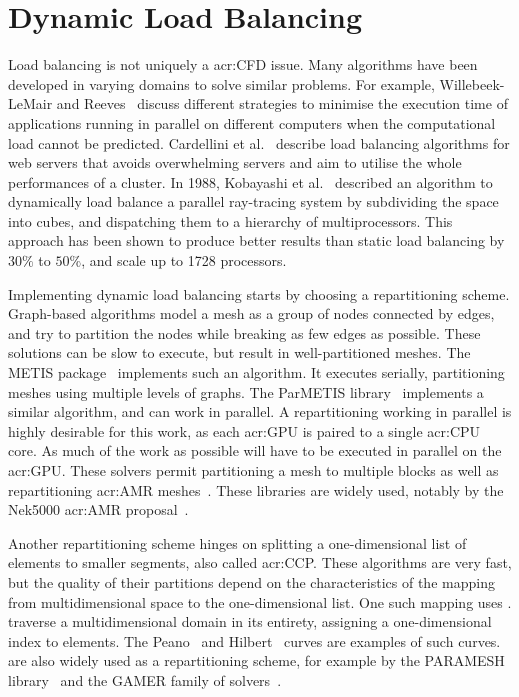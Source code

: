 \section{Dynamic Load Balancing}\label{section:literature_review:load_balancing}

Load balancing is not uniquely a \acrshort{acr:CFD} issue. Many algorithms have been developed in
varying domains to solve similar problems. For example, Willebeek-LeMair and
Reeves~\cite{Willebeek1993} discuss different strategies to minimise the execution time of
applications running in parallel on different computers when the computational load cannot be
predicted. Cardellini et al.~\cite{Cardellini1999} describe load balancing algorithms for web
servers that avoids overwhelming servers and aim to utilise the whole performances of a cluster. In
1988, Kobayashi et al.~\cite{Kobayashi1988} described an algorithm to dynamically load balance a
parallel ray-tracing system by subdividing the space into cubes, and dispatching them to a hierarchy
of multiprocessors. This approach has been shown to produce better results than static load
balancing by \(30 \% \) to \(50 \% \), and scale up to 1728 processors.

Implementing dynamic load balancing starts by choosing a repartitioning scheme. Graph-based
algorithms model a mesh as a group of nodes connected by edges, and try to partition the nodes while
breaking as few edges as possible. These solutions can be slow to execute, but result in
well-partitioned meshes. The METIS package~\cite{Karypis1997} implements such an algorithm. It
executes serially, partitioning meshes using multiple levels of graphs. The ParMETIS
library~\cite{Karypis1997P} implements a similar algorithm, and can work in parallel. A
repartitioning working in parallel is highly desirable for this work, as each \acrshort{acr:GPU} is
paired to a single \acrshort{acr:CPU} core. As much of the work as possible will have to be executed
in parallel on the \acrshort{acr:GPU}. These solvers permit partitioning a mesh to multiple blocks
as well as repartitioning \acrshort{acr:AMR} meshes~\cite{Karypis1997P}. These libraries are widely
used, notably by the Nek5000 \acrshort{acr:AMR} proposal~\cite{Peplinski2016}.

Another repartitioning scheme hinges on splitting a one-dimensional list of elements to smaller
segments, also called \acrfull{acr:CCP}. These algorithms are very fast, but the quality of their
partitions depend on the characteristics of the mapping from multidimensional space to the
one-dimensional list. One such mapping uses .  traverse a
multidimensional domain in its entirety, assigning a one-dimensional index to elements. The
Peano~\cite{Peano1890} and Hilbert~\cite{Hilbert1891} curves are examples of such curves.
 are also widely used as a repartitioning scheme, for example by the PARAMESH
library~\cite{MacNeice2000} and the GAMER family of solvers~\cite{Schive2018}.

